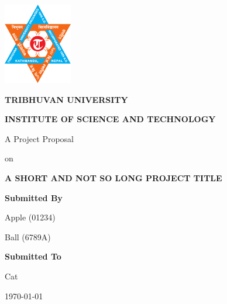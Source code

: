 \begin{titlepage}
    \centering
    
    \includegraphics[width=3cm]{images/TribhuvanUniversityLogo.png}\par\vspace{1cm}
    
    {\par\noindent\large\bfseries\MakeUppercase{Tribhuvan University}}
    
    
    {\par\noindent\large\bfseries\MakeUppercase{Institute of Science and Technology}}
    
    \vspace{1.5cm}
    
    {\par\noindent\large\bfseries{A Project Proposal\par on}}
    
    {\par\noindent\Large\bfseries\MakeUppercase{A Short and Not So Long Project Title}}
    
    \vspace{3cm}
    
    {\par\large\bfseries Submitted By}
    {\par\large Apple (01234) \par Ball (6789A)}

    \vspace{1cm}

    {\par\large\bfseries Submitted To}
    {\par\large Cat}
    
    \vfill
    
    {\par\large\today}
\end{titlepage}